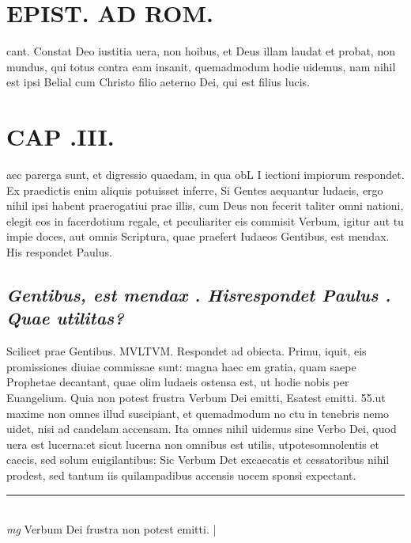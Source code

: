 \documentclass{article}
\begin{document}
\begin{pages}
\section*{EPIST. AD ROM.  }
\marginpar{[ p.24 ]}\pstart cant. Constat Deo iustitia uera, non hoibus, et Deus illam laudat et probat, non mundus, qui totus contra eam insanit, quemadmodum hodie uidemus, nam nihil est ipsi Belial cum Christo filio aeterno Dei, qui est filius lucis.   \pend
\endnumbering\beginnumbering\section{CAP .III.}\pstart aec parerga sunt, et digressio quaedam, in qua obL I iectioni impiorum respondet. Ex praedictis enim aliquis potuisset inferre, Si Gentes aequantur ludaeis, ergo nihil ipsi habent praerogatiui prae illis, cum Deus non fecerit taliter omni nationi, elegit eos in facerdotium regale, et peculiariter eis commisit Verbum, igitur aut tu impie doces, aut omnis Scriptura, quae praefert Iudaeos Gentibus, est mendax. His respondet Paulus.   \pend
{}
{}
\subsection*{\textit{\huge\textbf{Gentibus, est mendax . Hisrespondet Paulus . }\normalsize Quae utilitas? }}\pstart Scilicet prae Gentibus. MVLTVM. Respondet ad obiecta. Primu, iquit, eis promissiones diuiae commissae sunt: magna haec em gratia, quam saepe Prophetae decantant, quae olim ludaeis ostensa est, ut hodie nobis per Euangelium. Quia non potest frustra Verbum Dei emitti, Esatest emitti.  55.ut maxime non omnes illud suscipiant, et quemadmodum no ctu in tenebris nemo uidet, nisi ad candelam accensam.  Ita omnes nihil uidemus sine Verbo Dei, quod uera est lucerna:et sicut lucerna non omnibus est utilis, utpotesomnolentis et caecis, sed solum euigilantibus: Sic Verbum Det excaecatis et cessatoribus nihil prodest, sed tantum iis quilampadibus accensis uocem sponsi expectant.   \pend
\vspace{0.5cm}\noindent
\vspace{0.2cm}\rule{1cm}{0.2pt}\\ 
\hspace{0.2cm}\textit{mg}
\footnotesize Verbum Dei frustra non potest emitti.  
\normalsize| 

\end{pages}
\end{document}
